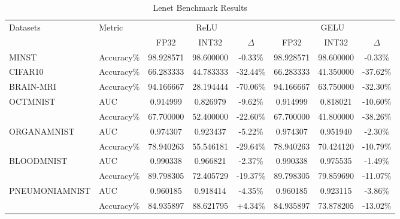 \documentclass{article}
\begin{document}
\begin{table}[ht]
\centering
\caption{Lenet Benchmark Results}
\begin{tabular}{|l|l|c|c|c|c|c|c|}
\hline
\multirow{2}{*}{Datasets} & \multirow{2}{*}{Metric} & \multicolumn{3}{c|}{ReLU} & \multicolumn{3}{c|}{GELU} \\
\cline{3-8}
& & FP32 & INT32 & $\Delta$ & FP32 & INT32 & $\Delta$ \\
\hline
MINST & Accuracy\% & 98.928571 & 98.600000 & -0.33\% & 98.928571 & 98.600000 & -0.33\% \\
\hline
CIFAR10 & Accuracy\% & 66.283333 & 44.783333 & -32.44\% & 66.283333 & 41.350000 & -37.62\% \\
\hline
BRAIN-MRI & Accuracy\% & 94.166667 & 28.194444 & -70.06\% & 94.166667 & 63.750000 & -32.30\% \\
\hline
OCTMNIST & AUC & 0.914999 & 0.826979 & -9.62\% & 0.914999 & 0.818021 & -10.60\% \\
 & Accuracy\% & 67.700000 & 52.400000 & -22.60\% & 67.700000 & 41.800000 & -38.26\% \\
\hline
ORGANAMNIST & AUC & 0.974307 & 0.923437 & -5.22\% & 0.974307 & 0.951940 & -2.30\% \\
 & Accuracy\% & 78.940263 & 55.546181 & -29.64\% & 78.940263 & 70.424120 & -10.79\% \\
\hline
BLOODMNIST & AUC & 0.990338 & 0.966821 & -2.37\% & 0.990338 & 0.975535 & -1.49\% \\
 & Accuracy\% & 89.798305 & 72.405729 & -19.37\% & 89.798305 & 79.859690 & -11.07\% \\
\hline
PNEUMONIAMNIST & AUC & 0.960185 & 0.918414 & -4.35\% & 0.960185 & 0.923115 & -3.86\% \\
 & Accuracy\% & 84.935897 & 88.621795 & +4.34\% & 84.935897 & 73.878205 & -13.02\% \\
\hline
\end{tabular}
\end{table}
\end{document}
